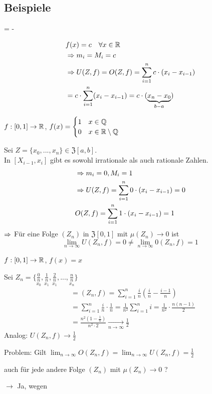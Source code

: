 \documentclass[10pt, a4paper, fleqn]{article}
\begin{document}
\subsection{Beispiele}
\begin{enumerate}[a)]
    {\abovedisplayskip = -\baselineskip
    \item \[\begin{aligned}
        &f(x) = c \quad \forall x \in \mathbb{R} \\
        &\Rightarrow m_i = M_i = c \\
        &\Rightarrow U(Z,f) = O(Z, f) = \sum_{i=1}^n c \cdot (x_i - x_{i-1}) \\
        &= c \cdot \sum_{i=1}^n (x_i - x_{i - 1}) = c \cdot (\underbrace{x_n - x_0}_{b - a})
    \end{aligned}\]}
    \item $f: [0, 1] \to \mathbb{R}$, $f(x) = \begin{cases}
        1 & x \in \mathbb{Q} \\
        0 & x \in \mathbb{R} \setminus \mathbb{Q}
    \end{cases}$

    Sei $Z = \{x_0, ..., x_n\} \in \mathfrak{Z}[a, b].$ \\
    In $[X_{i-1}, x_i]$ gibt es sowohl irrationale als auch rationale Zahlen.
    \[\begin{aligned}
        &\Rightarrow m_i = 0, M_i = 1 \\
        &\Rightarrow U(Z, f) = \sum_{i = 1}^n 0 \cdot (x_i - x_{i - 1}) = 0 \\
        &O(Z,f) = \sum_{i = 1}^n 1 \cdot (x_i - x_{i - 1}) = 1
    \end{aligned}\]
    $\Rightarrow$ Für eine Folge $(Z_n)$ in $\mathfrak{Z}[0, 1]$ mit $\mu(Z_n) \to 0$ ist
    \[
        \lim_{n \to \infty} U(Z_n, f) = 0 \neq \lim_{n \to \infty} 0(Z_n, f) = 1
    \]
    \item $f:[0, 1] \to \mathbb{R}$, $f(x) = x$ %

    Sei $Z_n = \{\underset{x_0}{\frac{0}{n}}, \underset{x_1}{\frac{1}{n}}, \underset{x_1}{\frac{2}{n}}, ..., \underset{x_n}{\frac{n}{n}}\}$
    \[\begin{aligned}
        &=(Z_n, f) = \sum_{i=1}^n \frac{i}{n} (\frac{i}{n} - \frac{i-1}{n}) \\
        &= \sum_{i=1}^n \frac{i}{n} \cdot \frac{1}{n} = \frac{1}{n^2} \sum_{i=1}^n i = \frac{1}{n^2} \cdot \frac{n(n-1)}{2} \\
        &= \frac{n^2 (1 - \frac{1}{n})}{n^2 \cdot 2} \xrightarrow[n \to \infty]{} \frac{1}{2}
    \end{aligned}\]
    Analog: $U(Z_n, f) \to \frac{1}{2}$

    Problem: Gilt $\displaystyle \lim_{n \to \infty} O(Z_n, f) = \lim_{n \to \infty} U(Z_n, f) = \frac{1}{2}$

    auch für jede andere Folge $(Z_n)$ mit $\mu(Z_n) \to 0$ ?

    $\rightarrow$ Ja, wegen
\end{enumerate}
\end{document}
